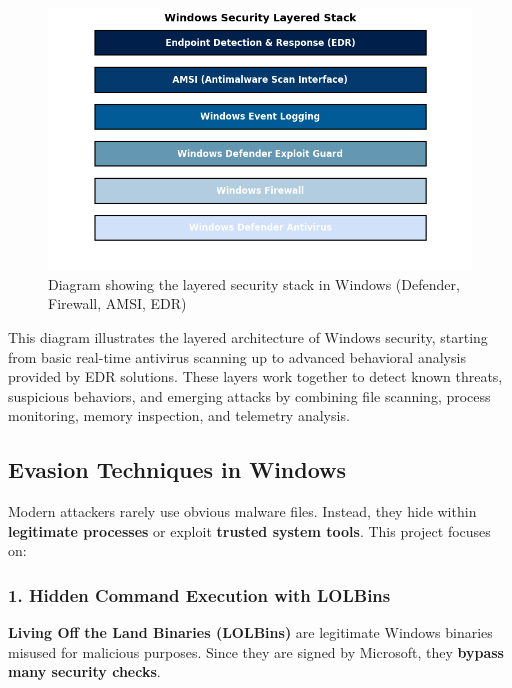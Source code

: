 \begin{figure}[H]
    \centering
    \includegraphics[width=\textwidth]{Pictures/windowssecuritylayer.png}
    \caption{Diagram showing the layered security stack in Windows (Defender, Firewall, AMSI, EDR)}
    \label{fig:windowssecuritylayer}
\end{figure}

This diagram illustrates the layered architecture of Windows security, starting from basic real-time antivirus scanning up to advanced behavioral analysis provided by EDR solutions. These layers work together to detect known threats, suspicious behaviors, and emerging attacks by combining file scanning, process monitoring, memory inspection, and telemetry analysis.

\subsection{Evasion Techniques in Windows}

Modern attackers rarely use obvious malware files. Instead, they hide within \textbf{legitimate processes} or exploit \textbf{trusted system tools}. This project focuses on:

\subsubsection{1. Hidden Command Execution with LOLBins}

\textbf{Living Off the Land Binaries (LOLBins)} are legitimate Windows binaries misused for malicious purposes. Since they are signed by Microsoft, they \textbf{bypass many security checks}.

